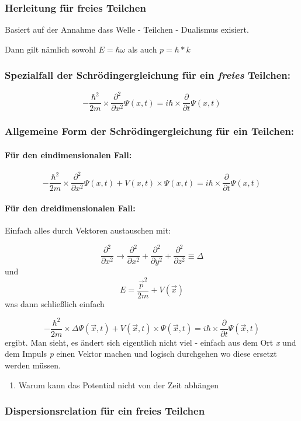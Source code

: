 \subsubsection{Herleitung für freies Teilchen}
Basiert auf der Annahme dass Welle - Teilchen - Dualismus exisiert. 

Dann gilt nämlich sowohl $E = \hbar \omega$ als auch $p = \hbar * k$

\subsubsection{Spezialfall der Schrödingergleichung für ein \textit{freies} Teilchen:}
\begin{equation}
    -\frac{\hbar^2}{2m} \times \frac{\partial^2}{\partial x^2} \Psi(x,t)  = i \hbar \times \frac{\partial}{\partial t} \Psi(x,t)
\end{equation}

\subsubsection{Allgemeine Form der Schrödingergleichung für ein Teilchen:}

\paragraph{Für den eindimensionalen Fall:}
\begin{equation}
    -\frac{\hbar^2}{2m} \times \frac{\partial^2}{\partial x^2} \Psi(x,t) + V(x,t) \times \Psi(x,t) = i \hbar \times \frac{\partial}{\partial t} \Psi(x,t)
\end{equation}

\paragraph{Für den dreidimensionalen Fall:}

Einfach alles durch Vektoren austauschen mit: 

\begin{equation}
    \frac{\partial^2}{\partial x^2} \longrightarrow \frac{\partial^2}{\partial x^2} + \frac{\partial^2}{\partial y^2} + \frac{\partial^2}{\partial z^2} \equiv \Delta
\end{equation}
und 
\begin{equation}
    E = \frac{\vec{p}^2}{2m} + V(\vec{x})
\end{equation}
was dann schließlich einfach

\begin{equation}
    -\frac{\hbar^2}{2m} \times \Delta \Psi(\vec{x},t) + V(\vec{x},t) \times \Psi(\vec{x},t) = i \hbar \times \frac{\partial}{\partial t} \Psi(\vec{x},t)
\end{equation}
ergibt. Man sieht, es ändert sich eigentlich nicht viel - einfach aus dem Ort \textit{x} und dem Impuls \textit{p} einen Vektor machen und logisch durchgehen wo diese ersetzt werden müssen. 

\begin{enumerate}
    \item Warum kann das Potential nicht von der Zeit abhängen
\end{enumerate}

\subsubsection{Dispersionsrelation für ein freies Teilchen}